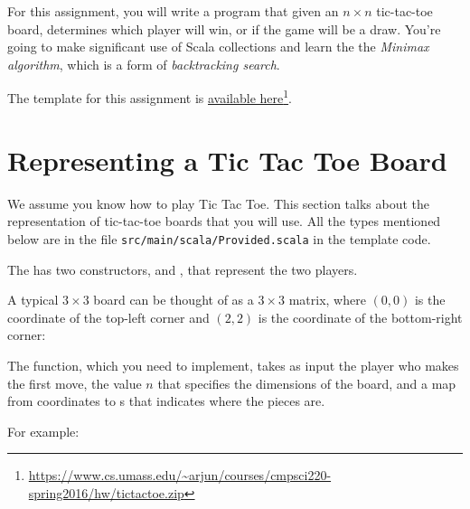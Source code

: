 \documentclass{book}
\begin{document}


For this assignment, you will write a program that given an $n \times n$ tic-tac-toe board,
determines which player will win, or if the game will be a draw.
You're going to make significant use of Scala collections and learn the the
\emph{Minimax algorithm}, which is a form of \emph{backtracking search}.

The template for this assignment is
\href{https://www.cs.umass.edu/~arjun/courses/cmpsci220-spring2016/hw/tictactoe.zip}{available here}\footnote{\url{https://www.cs.umass.edu/~arjun/courses/cmpsci220-spring2016/hw/tictactoe.zip}}.


\section{Representing a Tic Tac Toe Board}

We assume you know how to play Tic Tac Toe. This section talks about
the representation of tic-tac-toe boards that you will use. All
the types mentioned below are in the file \texttt{src/main/scala/Provided.scala}
in the template code.

The  has two constructors,
 and , that represent the
two players.

A typical $3 \times 3$ board can be thought of as a $3 \times 3$ matrix,
where $(0, 0)$ is
the coordinate of the top-left corner and $(2,2)$ is the coordinate of
the bottom-right corner:


The  function, which you need to implement,
takes as input the player who makes the first move, the
value $n$ that specifies the dimensions of the board, and a map from coordinates to s
that indicates where the pieces are.

For example:
\end{document}
